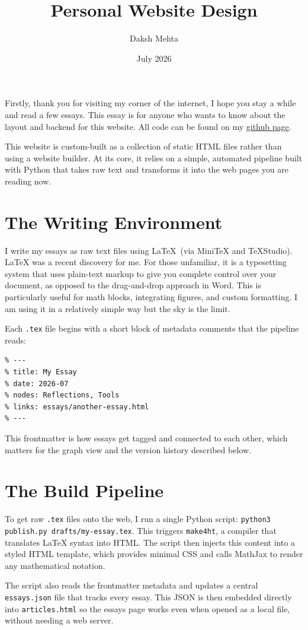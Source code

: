 \documentclass{article}
\title{Personal Website Design}
\date{July 2026}
\author{Daksh Mehta}
\begin{document}
Firstly, thank you for visiting my corner of the internet, I hope you stay a while and read a few essays. This essay is for anyone who wants to know about the layout and backend for this website. All code can be found on my \href{https://github.com/daksh-4/personal-website}{github page}.

This website is custom-built as a collection of static HTML files rather than using a website builder. At its core, it relies on a simple, automated pipeline built with Python that takes raw text and transforms it into the web pages you are reading now.

\section*{The Writing Environment}
I write my essays as raw text files using \LaTeX\ (via MiniTeX and TeXStudio). LaTeX was a recent discovery for me. For those unfamiliar, it is a typesetting system that uses plain-text markup to give you complete control over your document, as opposed to the drag-and-drop approach in Word. This is particularly useful for math blocks, integrating figures, and custom formatting. I am using it in a relatively simple way but the sky is the limit.

Each \texttt{.tex} file begins with a short block of metadata comments that the pipeline reads:

\begin{verbatim}
% ---
% title: My Essay
% date: 2026-07
% nodes: Reflections, Tools
% links: essays/another-essay.html
% ---
\end{verbatim}

\noindent This frontmatter is how essays get tagged and connected to each other, which matters for the graph view and the version history described below.

\section*{The Build Pipeline}
To get raw \texttt{.tex} files onto the web, I run a single Python script: \texttt{python3 publish.py drafts/my-essay.tex}. This triggers \texttt{make4ht}, a compiler that translates LaTeX syntax into HTML. The script then injects this content into a styled HTML template, which provides minimal CSS and calls MathJax to render any mathematical notation.

The script also reads the frontmatter metadata and updates a central \texttt{essays.json} file that tracks every essay. This JSON is then embedded directly into \texttt{articles.html} so the essays page works even when opened as a local file, without needing a web server.
\end{document}
